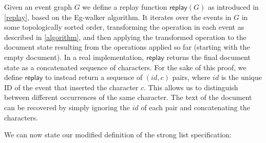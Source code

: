\documentclass[sigplan,10pt]{acmart}
\newcommand{\algname}{Eg-walker\xspace}
\begin{document}
Given an event graph $G$ we define a replay function $\mathsf{replay}(G)$ as introduced in \autoref{replay}, based on the \algname algorithm.
It iterates over the events in $G$ in some topologically sorted order, transforming the operation in each event as described in \autoref{algorithm}, and then applying the transformed operation to the document state resulting from the operations applied so far (starting with the empty document).
In a real implementation, $\mathsf{replay}$ returns the final document state as a concatenated sequence of characters.
For the sake of this proof, we define $\mathsf{replay}$ to instead return a sequence of $(\mathit{id}, c)$ pairs, where $\mathit{id}$ is the unique ID of the event that inserted the character $c$.
This allows us to distinguish between different occurrences of the same character.
The text of the document can be recovered by simply ignoring the $\mathit{id}$ of each pair and concatenating the characters.

We can now state our modified definition of the strong list specification:
\end{document}
